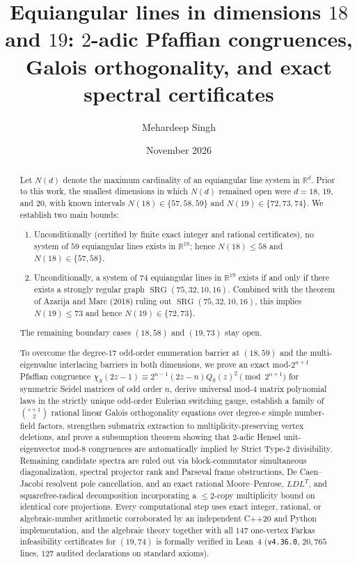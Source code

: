 \documentclass[11pt,reqno]{amsart}
\title[Equiangular lines in dimensions 18 and 19]{Equiangular lines in dimensions \texorpdfstring{$18$}{18} and \texorpdfstring{$19$}{19}: \texorpdfstring{$2$}{2}-adic Pfaffian congruences, Galois orthogonality, and exact spectral certificates}
\author{Mehardeep Singh}
\date{November 2026}
\theoremstyle{definition}
\theoremstyle{remark}
\numberwithin{equation}{section}
\numberwithin{table}{section}
\DeclareMathOperator{\SRG}{SRG}
\begin{document}
\begin{abstract}
Let $N(d)$ denote the maximum cardinality of an equiangular line system in $\mathbb{R}^d$. Prior to this work, the smallest dimensions in which $N(d)$ remained open were $d = 18$, $19$, and $20$, with known intervals $N(18) \in \{57, 58, 59\}$ and $N(19) \in \{72, 73, 74\}$. We establish two main bounds:
\begin{enumerate}
  \item Unconditionally (certified by finite exact integer and rational certificates), no system of $59$ equiangular lines exists in $\mathbb{R}^{18}$; hence $N(18) \le 58$ and $N(18) \in \{57, 58\}$.
  \item Unconditionally, a system of $74$ equiangular lines in $\mathbb{R}^{19}$ exists if and only if there exists a strongly regular graph $\SRG(75, 32, 10, 16)$. Combined with the theorem of Azarija and Marc (2018) ruling out $\SRG(75, 32, 10, 16)$, this implies $N(19) \le 73$ and hence $N(19) \in \{72, 73\}$.
\end{enumerate}
The remaining boundary cases $(18, 58)$ and $(19, 73)$ stay open.

To overcome the degree-$17$ odd-order enumeration barrier at $(18, 59)$ and the multi-eigenvalue interlacing barriers in both dimensions, we prove an exact mod-$2^{n+1}$ Pfaffian congruence $\chi_S(2z - 1) \equiv 2^{n-1}(2z - n)Q_0(z)^2 \pmod{2^{n+1}}$ for symmetric Seidel matrices of odd order $n$, derive universal mod-$4$ matrix polynomial laws in the strictly unique odd-order Eulerian switching gauge, establish a family of $\binom{e+1}{2}$ rational linear Galois orthogonality equations over degree-$e$ simple number-field factors, strengthen submatrix extraction to multiplicity-preserving vertex deletions, and prove a subsumption theorem showing that $2$-adic Hensel unit-eigenvector mod-$8$ congruences are automatically implied by Strict Type-2 divisibility. Remaining candidate spectra are ruled out via block-commutator simultaneous diagonalization, spectral projector rank and Parseval frame obstructions, De Caen--Jacobi resolvent pole cancellation, and an exact rational Moore--Penrose, $LDL^T$, and squarefree-radical decomposition incorporating a $\le 2$-copy multiplicity bound on identical core projections. Every computational step uses exact integer, rational, or algebraic-number arithmetic corroborated by an independent C++20 and Python implementation, and the algebraic theory together with all $147$ one-vertex Farkas infeasibility certificates for $(19, 74)$ is formally verified in Lean~4 (\texttt{v4.36.0}, $20{,}765$ lines, $127$ audited declarations on standard axioms).
\end{abstract}
\end{document}
